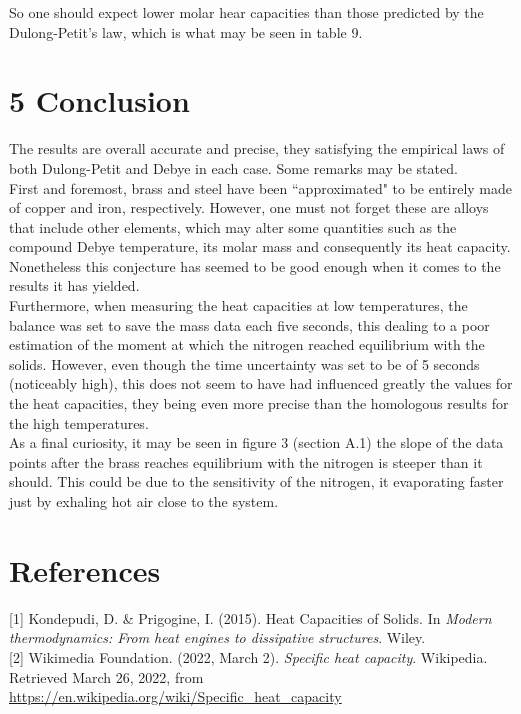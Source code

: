 \documentclass[a4paper, 12pt]{article}
\begin{document}
	So one should expect lower molar hear capacities than those predicted by the Dulong-Petit's law, which is what may be seen in table 9.\\
	\section{5 Conclusion}
	The results are overall accurate and precise, they satisfying the empirical laws of both Dulong-Petit and Debye in each case. Some remarks may be stated. \\
	
	First and foremost, brass and steel have been ``approximated" to be entirely made of copper and iron, respectively. However, one must not forget these are alloys that include other elements, which may alter some quantities such as the compound Debye temperature, its molar mass and consequently its heat capacity. Nonetheless this conjecture has seemed to be good enough when it comes to the results it has yielded. \\
	
	Furthermore, when measuring the heat capacities at low temperatures, the balance was set to save the mass data each five seconds, this dealing to a poor estimation of the moment at which the nitrogen reached equilibrium with the solids. However, even though the time uncertainty was set to be of 5 seconds (noticeably high), this does not seem to have had influenced greatly the values for the heat capacities, they being even more precise than the homologous results for the high temperatures. \\
	
	As a final curiosity, it may be seen in figure 3 (section A.1) the slope of the data points after the brass reaches equilibrium with the nitrogen is steeper than it should. This could be due to the sensitivity of the nitrogen, it evaporating faster just by exhaling hot air close to the system.   
	
	\section{References}
	[1] Kondepudi, D. \& Prigogine, I. (2015). Heat Capacities of Solids. In \textit{Modern thermodynamics: From heat engines to dissipative structures}. Wiley. \\
	
	[2] Wikimedia Foundation. (2022, March 2). \textit{Specific heat capacity}. Wikipedia. Retrieved March 26, 2022, from \url{https://en.wikipedia.org/wiki/Specific\_heat\_capacity}\\
	
\end{document}
